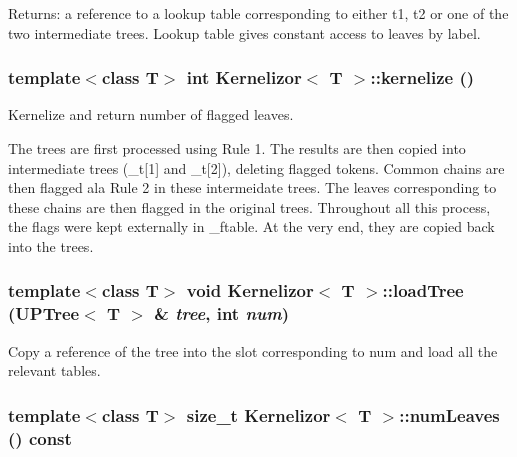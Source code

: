 \begin{Desc}
\item[Returns:]a reference to a lookup table corresponding to either t1, t2 or one of the two intermediate trees. Lookup table gives constant access to leaves by label. \end{Desc}
\subsubsection{\setlength{\rightskip}{0pt plus 5cm}template$<$class T$>$ int {\bf Kernelizor}$<$ T $>$::kernelize ()\hspace{0.3cm}{\tt  [inline]}}\label{classKernelizor_a4}


Kernelize and return number of flagged leaves. 

The trees are first processed using Rule 1. The results are then copied into intermediate trees (\_\-t[1] and \_\-t[2]), deleting flagged tokens. Common chains are then flagged ala Rule 2 in these intermeidate trees. The leaves corresponding to these chains are then flagged in the original trees. Throughout all this process, the flags were kept externally in \_\-ftable. At the very end, they are copied back into the trees. 
\subsubsection{\setlength{\rightskip}{0pt plus 5cm}template$<$class T$>$ void {\bf Kernelizor}$<$ T $>$::load\-Tree ({\bf UPTree}$<$ T $>$ \& {\em tree}, int {\em num})\hspace{0.3cm}{\tt  [protected]}}\label{classKernelizor_b0}


Copy a reference of the tree into the slot corresponding to num and load all the relevant tables. 

\subsubsection{\setlength{\rightskip}{0pt plus 5cm}template$<$class T$>$ size\_\-t {\bf Kernelizor}$<$ T $>$::num\-Leaves () const\hspace{0.3cm}{\tt  [inline]}}\label{classKernelizor_a5}


